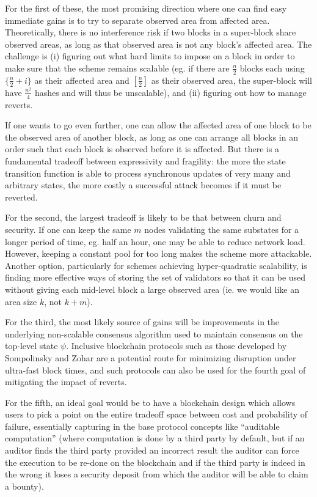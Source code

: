 \documentclass[11pt,a4paper]{report}
\theoremstyle{plain}
\theoremstyle{definition}
\theoremstyle{remark}
\begin{document}
For the first of these, the most promising direction where one can find easy immediate gains is to try to separate observed area from affected area. Theoretically, there is no interference risk if two blocks in a super-block share observed areas, as long as that observed area is not any block's affected area. The challenge is (i) figuring out what hard limits to impose on a block in order to make sure that the scheme remains scalable (eg. if there are $\frac{n}{2}$ blocks each using $\{\frac{n}{2}+i\}$ as their affected area and $[\frac{n}{2}]$ as their observed area, the super-block will have $\frac{n^2}{4}$ hashes and will thus be unscalable), and (ii) figuring out how to manage reverts.

If one wants to go even further, one can allow the affected area of one block to be the observed area of another block, as long as one can arrange all blocks in an order such that each block is observed before it is affected. But there is a fundamental tradeoff between expressivity and fragility: the more the state transition function is able to process synchronous updates of very many and arbitrary states, the more costly a successful attack becomes if it must be reverted.

For the second, the largest tradeoff is likely to be that between churn and security. If one can keep the same $m$ nodes validating the same substates for a longer period of time, eg. half an hour, one may be able to reduce network load. However, keeping a constant pool for too long makes the scheme more attackable. Another option, particularly for schemes achieving hyper-quadratic scalability, is finding more effective ways of storing the set of validators so that it can be used without giving each mid-level block a large observed area (ie. we would like an area size $k$, not $k + m$).

For the third, the most likely source of gains will be improvements in the underlying non-scalable consensus algorithm used to maintain consensus on the top-level state $\psi$. Inclusive blockchain protocols such as those developed by Sompolinsky and Zohar \cite{inclusive} are a potential route for minimizing disruption under ultra-fast block times, and such protocols can also be used for the fourth goal of mitigating the impact of reverts.

For the fifth, an ideal goal would be to have a blockchain design which allows users to pick a point on the entire tradeoff space between cost and probability of failure, essentially capturing in the base protocol concepts like ``auditable computation'' \cite{auditable} (where computation is done by a third party by default, but if an auditor finds the third party provided an incorrect result the auditor can force the execution to be re-done on the blockchain and if the third party is indeed in the wrong it loses a security deposit from which the auditor will be able to claim a bounty).
\end{document}
